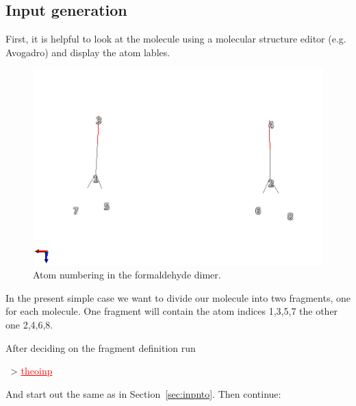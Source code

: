 \documentclass[DIV=12,headings=normal]{scrartcl}
\newcommand{\redl}[1]{{\textcolor{red}{\underline{#1}}}}
\newcommand{\comm}[1]{
\small
~> \redl{#1}
\normalsize
}
\newcounter{number}
\begin{document}
\subsection{Input generation}
\label{sec:inpct}
First, it is helpful to look at the molecule using a molecular structure editor (e.g. Avogadro) and display the atom lables.

\begin{figure}[h]
\begin{center}
\includegraphics[trim=1cm 2cm 1cm 2cm, clip=true, scale=1]{fa2/fa2avo.png}
\caption{Atom numbering in the formaldehyde dimer.}
\label{fig:fanrs}
\end{center}
\end{figure}

In the present simple case we want to divide our molecule into two fragments, one for each molecule.
One fragment will contain the atom indices 1,3,5,7 the other one 2,4,6,8.

After deciding on the fragment definition run 

\comm{theoinp}

And start out the same as in Section~\ref{sec:inpnto}. Then continue:
\end{document}
